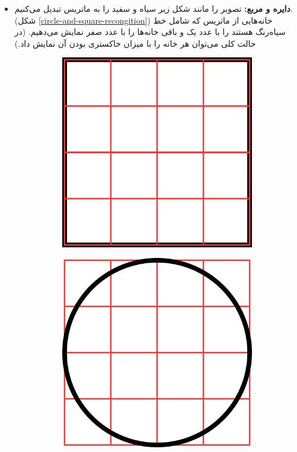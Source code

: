 \documentclass[14pt,a4]{article}
\begin{document}
\begin{itemize}
    \item \textbf{دایره و مربع:} تصویر را مانند شکل زیر سیاه و سفید را به ماتریس تبدیل می‌کنیم.(شکل \ref{circle-and-square-recongition})
    خانه‌هایی از ماتریس که شامل خط سیاه‌رنگ هستند را با عدد یک و باقی خانه‌ها را با عدد صفر نمایش می‌دهیم.
    (در حالت کلی می‌توان هر خانه را با میزان خاکستری بودن آن نمایش داد.)

    \begin{figure}[h]
        \centering
        \begin{subfigure}{0.45\textwidth}
            \centering
            \includegraphics[scale=0.5]{images/q2/square.png}
        \end{subfigure}
        \hfill
        \begin{subfigure}{0.45\textwidth}
            \centering
            \includegraphics[scale=0.5]{images/q2/circle.png}

\end{subfigure}
\end{figure}
\end{itemize}
\end{document}
